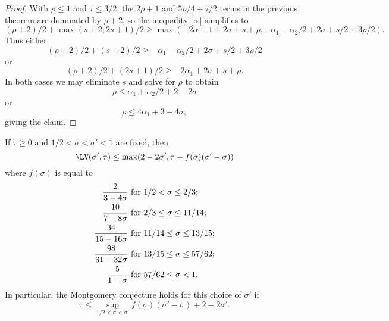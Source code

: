 \begin{proof}  With $\rho \leq 1$ and $\tau \leq 3/2$, the $2\rho+1$ and $5\rho/4+\tau/2$ terms in the previous theorem are dominated by $\rho+2$, so the inequality \eqref{rs} simplifies to
$$(\rho+2)/2 + \max(s+2, 2s+1)/2 \geq
    \max( -2\alpha-1 + 2\sigma + s + \rho, -\alpha_1 - \alpha_2/2 + 2\sigma + s/2 + 3\rho/2).$$
Thus either
$$(\rho+2)/2 + (s+2)/2 \geq -\alpha_1 - \alpha_2/2 + 2\sigma + s/2 + 3\rho/2$$
or
$$(\rho+2)/2 + (2s+1)/2 \geq  -2\alpha_1 + 2\sigma + s + \rho.$$
In both cases we may eliminate $s$ and solve for $\rho$ to obtain
$$ \rho \leq \alpha_1 + \alpha_2/2 + 2 - 2 \sigma $$
or
$$ \rho \leq 4\alpha_1 + 3 - 4 \sigma,$$
giving the claim.
\end{proof}


\begin{theorem}\cite[Lemma 8.2]{ivic}  If $\tau \geq 0$ and $1/2 < \sigma < \sigma' < 1$ are fixed, then
$$ \LV(\sigma', \tau) \leq \max( 2 - 2\sigma', \tau - f(\sigma) (\sigma'-\sigma) )$$
where $f(\sigma)$ is equal to
\begin{align*}
\frac{2}{3-4\sigma} &\hbox{ for } 1/2 < \sigma \leq 2/3; \\
\frac{10}{7-8\sigma} &\hbox{ for } 2/3 \leq \sigma \leq 11/14; \\
\frac{34}{15-16\sigma} &\hbox{ for } 11/14 \leq \sigma \leq 13/15; \\
\frac{98}{31-32\sigma} &\hbox{ for } 13/15 \leq \sigma \leq 57/62; \\
\frac{5}{1-\sigma} &\hbox{ for } 57/62 \leq \sigma < 1.
\end{align*}
In particular, the Montgomery conjecture holds for this choice of $\sigma'$ if
$$ \tau \leq \sup_{1/2 < \sigma < \sigma'} f(\sigma) (\sigma'-\sigma) + 2 - 2 \sigma'.$$
\end{theorem}

